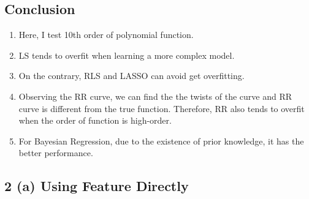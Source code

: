 \documentclass{article}
\begin{document}
\subsection*{Conclusion}
\begin{enumerate}[label=(\roman*)]
    \item Here, I test 10th order of polynomial function.
    \item LS tends to overfit when learning a more complex model.
    \item On the contrary, RLS and LASSO can avoid get overfitting.
    \item Observing the RR curve, we can find the the twists of the curve and RR curve is different from the true function. Therefore, RR also tends to overfit when the order of function is high-order. 
    \item For Bayesian Regression, due to the existence of prior knowledge, it has the better performance.
\end{enumerate}

\subsection*{2 (a) Using Feature Directly}
\end{document}
